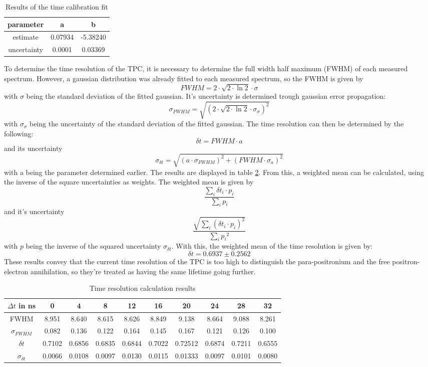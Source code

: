 \begin{table}[]
    \centering
    \caption{Results of the time calibration fit}
    \begin{tabular}{cc c}
        parameter & a & b \\ \hline
        estimate & 0.07934 & -5.38240 \\
        uncertainty & 0.0001  &0.03369\\
        \hline
    \end{tabular}
    
    \label{tab:timecalfit}
\end{table}
To determine the time resolution of the TPC, it is necessary to determine the full width half  maximum (FWHM) of each measured spectrum. However, a gaussian distribution was already fitted to each measured spectrum, so the FWHM is given by 
$$FWHM = 2 \cdot \sqrt{2\cdot\ln{2}} \cdot \sigma$$
with $\sigma$ being the standard deviation of the fitted gaussian. It's uncertainty is determined trough gaussian error propagation: 
$$\sigma_{FWHM} = \sqrt{(2 \cdot \sqrt{2\cdot\ln{2}} \cdot \sigma_\sigma)^2}$$
with $\sigma_\sigma$ being the uncertainty of the standard deviation of the fitted gaussian.
The time resolution can then be determined by the following:
$$\delta t = FWHM \cdot a$$ and its uncertainty $$\sigma_{\delta t} = \sqrt{(a \cdot\sigma_{FWHM})^2 + (FWHM \cdot \sigma_a)^2}$$
with a being the parameter determined earlier.
The results are displayed in table \ref{tab:time res}. From this, a weighted mean can be calculated, using the inverse of the square uncertainties as weights. 
The weighted mean is given by 
$$\frac{\sum_i{\delta t_i \cdot p_i}}{\sum_i{p_i}}$$
and it's uncertainty
$$\frac{\sqrt{\sum_i{(\delta t_i \cdot p_i)}^2}}{\sum_i{p_i}^2}$$
with $p$ being the inverse of the squared uncertainty $\sigma_{\delta t}$.
With this, the weighted mean of the time resolution is given by: 
$$\delta t = 0.6937 \pm 0.2562$$
These results convey that the current time resolution of the TPC is too high to distinguish the para-positronium and the free positron-electron annihilation, so they're treated as having the same lifetime going further.  

\begin{table}[]
    \centering
    \caption{Time resolution calculation results}
    \begin{tabular}{cccccccccc}
         $\Delta t$ in ns & 0 & 4 & 8 & 12 & 16 &20 & 24 & 28 & 32 \\\hline 
         FWHM & 8.951& 8.640& 8.615 &8.626& 8.849& 9.138& 8.664& 9.088 &8.261 \\
         $\sigma_{FWHM}$ & 0.082 &0.136& 0.122& 0.164& 0.145& 0.167& 0.121& 0.126 &0.100 \\
         $\delta t$ &0.7102 &0.6856 &0.6835 &0.6844& 0.7022 &0.72512
 &0.6874 &0.7211& 0.6555 \\
         $\sigma_{\delta t}$ &0.0066 & 0.0108& 0.0097& 0.0130 &0.0115& 0.01333&
 0.0097& 0.0101 &0.0080 \\\hline
    \end{tabular}
    \label{tab:time res}
\end{table}

